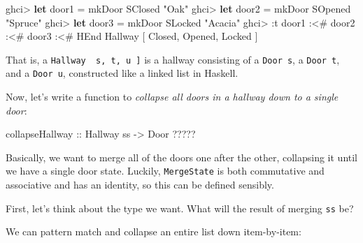 \documentclass[]{article}
\newenvironment{Shaded}{}{}
\newcommand{\DataTypeTok}[1]{\textcolor[rgb]{0.56,0.13,0.00}{#1}}
\newcommand{\KeywordTok}[1]{\textcolor[rgb]{0.00,0.44,0.13}{\textbf{#1}}}
\newcommand{\NormalTok}[1]{#1}
\newcommand{\OperatorTok}[1]{\textcolor[rgb]{0.40,0.40,0.40}{#1}}
\newcommand{\OtherTok}[1]{\textcolor[rgb]{0.00,0.44,0.13}{#1}}
\newcommand{\StringTok}[1]{\textcolor[rgb]{0.25,0.44,0.63}{#1}}
\begin{document}
\begin{Shaded}
\begin{Highlighting}[]
\NormalTok{ghci}\OperatorTok{\textgreater{}} \KeywordTok{let}\NormalTok{ door1 }\OtherTok{=}\NormalTok{ mkDoor }\DataTypeTok{SClosed} \StringTok{"Oak"}
\NormalTok{ghci}\OperatorTok{\textgreater{}} \KeywordTok{let}\NormalTok{ door2 }\OtherTok{=}\NormalTok{ mkDoor }\DataTypeTok{SOpened} \StringTok{"Spruce"}
\NormalTok{ghci}\OperatorTok{\textgreater{}} \KeywordTok{let}\NormalTok{ door3 }\OtherTok{=}\NormalTok{ mkDoor }\DataTypeTok{SLocked} \StringTok{"Acacia"}
\NormalTok{ghci}\OperatorTok{\textgreater{}} \OperatorTok{:}\NormalTok{t door1 }\OperatorTok{:\textless{}\#}\NormalTok{ door2 }\OperatorTok{:\textless{}\#}\NormalTok{ door3 }\OperatorTok{:\textless{}\#} \DataTypeTok{HEnd}
\DataTypeTok{Hallway}\NormalTok{ \textquotesingle{}[ }\DataTypeTok{\textquotesingle{}Closed}\NormalTok{, }\DataTypeTok{\textquotesingle{}Opened}\NormalTok{, }\DataTypeTok{\textquotesingle{}Locked}\NormalTok{ ]}
\end{Highlighting}
\end{Shaded}

That is, a \texttt{Hallway\ \textquotesingle{}{[}\ s,\ t,\ u\ {]}} is a hallway
consisting of a \texttt{Door\ s}, a \texttt{Door\ t}, and a \texttt{Door\ u},
constructed like a linked list in Haskell.

Now, let's write a function to \emph{collapse all doors in a hallway down to a
single door}:

\begin{Shaded}
\begin{Highlighting}[]
\OtherTok{collapseHallway ::} \DataTypeTok{Hallway}\NormalTok{ ss }\OtherTok{{-}\textgreater{}} \DataTypeTok{Door} \OperatorTok{?????}
\end{Highlighting}
\end{Shaded}

Basically, we want to merge all of the doors one after the other, collapsing it
until we have a single door state. Luckily, \texttt{MergeState} is both
commutative and associative and has an identity, so this can be defined
sensibly.

First, let's think about the type we want. What will the result of merging
\texttt{ss} be?

We can pattern match and collapse an entire list down item-by-item:

\begin{Shaded}
\end{Shaded}
\end{document}
